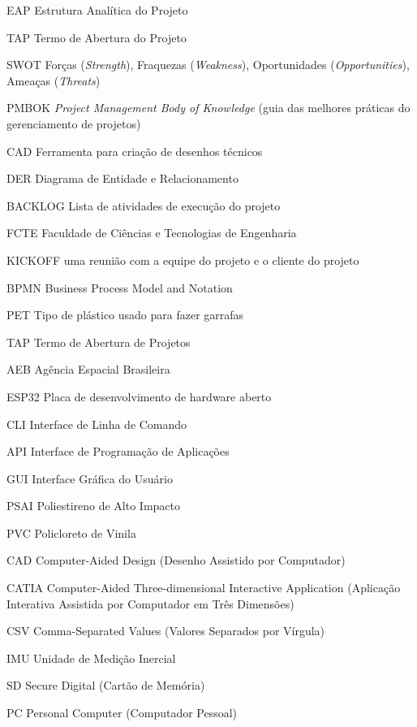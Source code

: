 \begin{siglas}
	\item[EAP] Estrutura Analítica do Projeto
	\item[TAP] Termo de Abertura do Projeto
	\item[SWOT] Forças (\textit{Strength}), Fraquezas (\textit{Weakness}), Oportunidades (\textit{Opportunities}), Ameaças (\textit{Threats})
	\item[PMBOK] \textit{Project Management Body of Knowledge} (guia das melhores práticas do gerenciamento de projetos)
	\item[CAD] Ferramenta para criação de desenhos técnicos
	\item[DER] Diagrama de Entidade e Relacionamento
	\item[BACKLOG] Lista de atividades de execução do projeto
	\item[FCTE] Faculdade de Ciências e Tecnologias de Engenharia
	\item[KICKOFF] uma reunião com a equipe do projeto e o cliente do projeto
	\item[BPMN] Business Process Model and Notation
	\item[PET] Tipo de plástico usado para fazer garrafas
	\item[TAP] Termo de Abertura de Projetos
	\item[AEB] Agência Espacial Brasileira
	\item[ESP32] Placa de desenvolvimento de hardware aberto
	\item[CLI] Interface de Linha de Comando
	\item[API] Interface de Programação de Aplicações
	\item[GUI] Interface Gráfica do Usuário
	\item[PSAI] Poliestireno de Alto Impacto
	\item[PVC] Policloreto de Vinila
	\item[CAD] Computer-Aided Design (Desenho Assistido por Computador)
	\item[CATIA] Computer-Aided Three-dimensional Interactive Application (Aplicação Interativa Assistida por Computador em Três Dimensões)
	\item[CSV] Comma-Separated Values (Valores Separados por Vírgula)
	\item[IMU] Unidade de Medição Inercial
	\item[SD] Secure Digital (Cartão de Memória)
	\item[PC] Personal Computer (Computador Pessoal)
\end{siglas}
